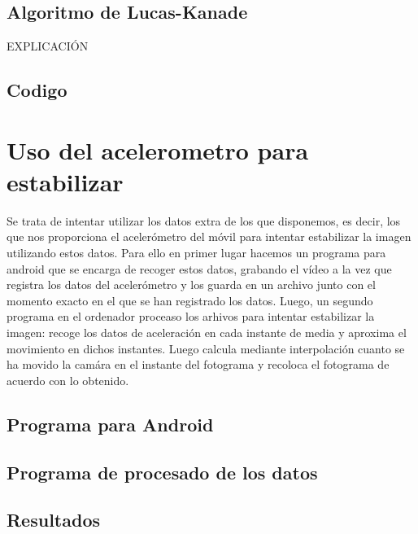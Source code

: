 \documentclass[a4paper,openright, 12pt]{book}
\begin{document}
\subsection{Algoritmo de Lucas-Kanade}
EXPLICACIÓN

\subsection{Codigo}


\section{Uso del acelerometro para estabilizar}
Se trata de intentar utilizar los datos extra de los que disponemos, es decir, los que nos proporciona el acelerómetro del móvil para intentar estabilizar la imagen utilizando estos datos.
Para ello en primer lugar hacemos un programa para android que se encarga de recoger estos datos, grabando el vídeo a la vez que registra los datos del acelerómetro y los guarda en un archivo junto con el momento exacto en el que se han registrado los datos.
Luego, un segundo programa en el ordenador proceaso los arhivos para intentar estabilizar la imagen: recoge los datos de aceleración en cada instante de media y aproxima el movimiento en dichos instantes. Luego calcula mediante interpolación cuanto se ha movido la camára en el instante del fotograma y recoloca el fotograma de acuerdo con lo obtenido.

\subsection{Programa para Android}


\subsection{Programa de procesado de los datos}


\subsection{Resultados}

\cleardoublepage
{}
\end{document}

